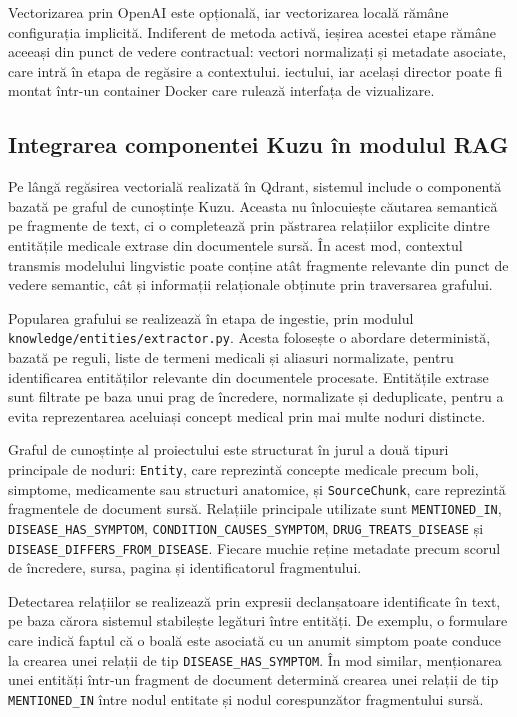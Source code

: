 \documentclass[12pt, a4paper, oneside, romanian]{teza-upb}
\begin{document}
Vectorizarea prin OpenAI este opțională, iar vectorizarea locală rămâne configurația implicită. Indiferent de metoda activă, ieșirea acestei etape rămâne aceeași din punct de vedere contractual: vectori normalizați și metadate asociate, care intră în etapa de regăsire a contextului.
iectului, iar același director poate fi montat într-un container Docker care rulează interfața de vizualizare.



\subsection{Integrarea componentei Kuzu în modulul RAG}

Pe lângă regăsirea vectorială realizată în Qdrant, sistemul include o componentă bazată pe graful de cunoștințe Kuzu. Aceasta nu înlocuiește căutarea semantică pe fragmente de text, ci o completează prin păstrarea relațiilor explicite dintre entitățile medicale extrase din documentele sursă. În acest mod, contextul transmis modelului lingvistic poate conține atât fragmente relevante din punct de vedere semantic, cât și informații relaționale obținute prin traversarea grafului.

Popularea grafului se realizează în etapa de ingestie, prin modulul \texttt{knowledge/entities/extractor.py}. Acesta folosește o abordare deterministă, bazată pe reguli, liste de termeni medicali și aliasuri normalizate, pentru identificarea entităților relevante din documentele procesate. Entitățile extrase sunt filtrate pe baza unui prag de încredere, normalizate și deduplicate, pentru a evita reprezentarea aceluiași concept medical prin mai multe noduri distincte.

Graful de cunoștințe al proiectului este structurat în jurul a două tipuri principale de noduri: \texttt{Entity}, care reprezintă concepte medicale precum boli, simptome, medicamente sau structuri anatomice, și \texttt{SourceChunk}, care reprezintă fragmentele de document sursă. Relațiile principale utilizate sunt \texttt{MENTIONED\_IN}, \texttt{DISEASE\_HAS\_SYMPTOM}, \texttt{CONDITION\_CAUSES\_SYMPTOM}, \texttt{DRUG\_TREATS\_DISEASE} și \texttt{DISEASE\_DIFFERS\_FROM\_DISEASE}. Fiecare muchie reține metadate precum scorul de încredere, sursa, pagina și identificatorul fragmentului.

Detectarea relațiilor se realizează prin expresii declanșatoare identificate în text, pe baza cărora sistemul stabilește legături între entități. De exemplu, o formulare care indică faptul că o boală este asociată cu un anumit simptom poate conduce la crearea unei relații de tip \texttt{DISEASE\_HAS\_SYMPTOM}. În mod similar, menționarea unei entități într-un fragment de document determină crearea unei relații de tip \texttt{MENTIONED\_IN} între nodul entitate și nodul corespunzător fragmentului sursă.
\end{document}
